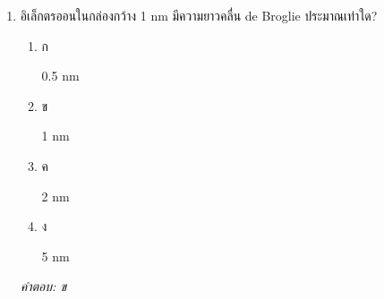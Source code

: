 \documentclass[12pt]{article}
\begin{document}
\begin{enumerate}[label=\arabic*., itemsep=0.5\baselineskip, topsep=0.5\baselineskip, leftmargin=*]
\item อิเล็กตรออนในกล่องกว้าง 1 nm มีความยาวคลื่น de Broglie ประมาณเท่าใด?
\begin{enumerate}[label=\alph*)., itemsep=0.3\baselineskip, topsep=0.3\baselineskip]
\item ก\ 
\begin{minipage}[t]{0.9\linewidth}
\raggedright 0.5 nm
\end{minipage}
\item ข\ 
\begin{minipage}[t]{0.9\linewidth}
\raggedright 1 nm
\end{minipage}
\item ค\ 
\begin{minipage}[t]{0.9\linewidth}
\raggedright 2 nm
\end{minipage}
\item ง\ 
\begin{minipage}[t]{0.9\linewidth}
\raggedright 5 nm
\end{minipage}
\end{enumerate}
\vspace{-0.3\baselineskip}
\begin{small}
\textit{คำตอบ: ข}
\end{small}

\end{enumerate}
\end{document}
